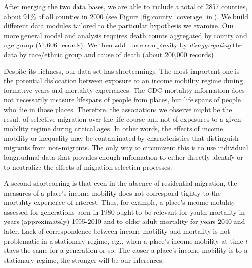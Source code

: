 \documentclass[11pt]{article}
\begin{document}
After merging the two data bases, we are able to include a total of 2867 counties, about 91\% of all counties in 2000 (see Figure \ref{fig:county_coverage} in \textit{}). We build different data modules tailored to the particular hypothesis we examine. Our more general model and analysis requires death counts aggregated by county and age group (51,606 records). We then add more complexity by \textit{disaggregating} the data by race/ethnic group and cause of death (about 200,000 records). 

Despite its richness, our data set has shortcomings. The most important one is the potential dislocation between exposure to an income mobility regime during formative years and mortality experiences. The CDC mortality information does not necessarily measure lifespans of people from places, but life spans of people who die in those places. Therefore, the associations we observe might be the result of selective migration over the life-course and not of exposures to a given mobility regime during critical ages. In other words, the effects of income mobility or inequality may be contaminated by characteristics that distinguish migrants from non-migrants. The only way to circumvent this is to use individual longitudinal data that provides enough information to either directly identify or to neutralize the effects of migration selection processes.

A second shortcoming is that even in the absence of residential migration, the measures of a place's income mobility does not correspond tightly to the mortality experience of interest. Thus, for example, a place's income mobility assessed for generations born in 1980 ought to be relevant for youth mortality in years (approximately) 1995-2010 and to older adult mortality for years 2040 and later. Lack of correspondence between income mobility and mortality is not problematic in a stationary regime, e.g., when a place's income mobility at time $t$ stays the same for a generation or so. The closer a place's income mobility is to a stationary regime, the stronger will be our inferences.


\end{document}
